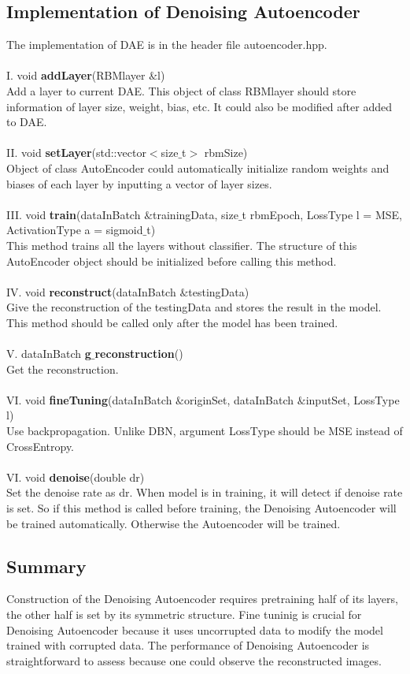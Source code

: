\documentclass[12pt]{article}
\begin{document}
\subsection{Implementation of Denoising Autoencoder}
The implementation of DAE is in the header file autoencoder.hpp.\\
\\
I. void \textbf{addLayer}(RBMlayer $\&$l)\\
Add a layer to current DAE. This object of class RBMlayer should store information of layer size, weight, bias, etc. It could also be modified after added to DAE.\\
\\
II. void \textbf{setLayer}(std::vector$<$size$\_$t$>$ rbmSize)\\
Object of class AutoEncoder could automatically initialize random weights and biases of each layer by inputting a vector of layer sizes.\\
\\
III. void \textbf{train}(dataInBatch $\&$trainingData, size$\_$t rbmEpoch, LossType l = MSE, ActivationType a = sigmoid$\_$t)\\
This method trains all the layers without classifier. The structure of this AutoEncoder object should be initialized before calling this method. \\
\\
IV. void \textbf{reconstruct}(dataInBatch $\&$testingData)\\
Give the reconstruction of the testingData and stores the result in the model. This method should be called only after the model has been trained.\\
\\
V. dataInBatch \textbf{g$\_$reconstruction}()\\
Get the reconstruction.\\
\\
VI. void \textbf{fineTuning}(dataInBatch $\&$originSet, dataInBatch $\&$inputSet, LossType l)\\
Use backpropagation. Unlike DBN, argument LossType should be MSE instead of CrossEntropy.\\
\\
VI. void \textbf{denoise}(double dr)\\
Set the denoise rate as dr. When model is in training, it will detect if denoise rate is set. So if this method is called before training, the Denoising Autoencoder will be trained automatically. Otherwise the Autoencoder will be trained.
\subsection{Summary}
Construction of the Denoising Autoencoder requires pretraining half of its layers, the other half is set by its symmetric structure. Fine tuninig is crucial for Denoising Autoencoder because it uses uncorrupted data to modify the model trained with corrupted data. The performance of Denoising Autoencoder is straightforward to assess because one could observe the reconstructed images.
\clearpage
\end{document}

